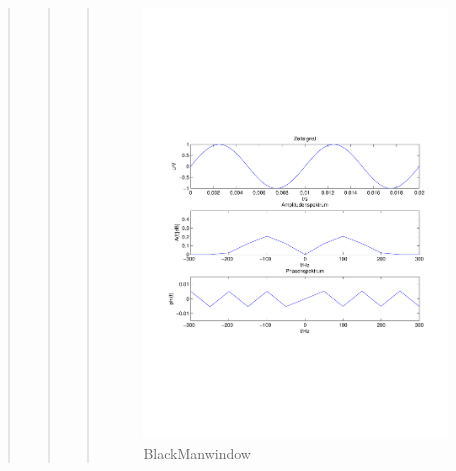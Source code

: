 \begin{quote}
\begin{quote}
\begin{quote}
            \begin{figure}[H]
            \centering
                \includegraphics[scale=0.5, trim = 1.5cm 7cm 1.5cm 8cm, clip]{./Bilder/BlackManwindow}
                    \caption{BlackManwindow}
            \end{figure}
    

\end{quote}
\end{quote}
\end{quote}

